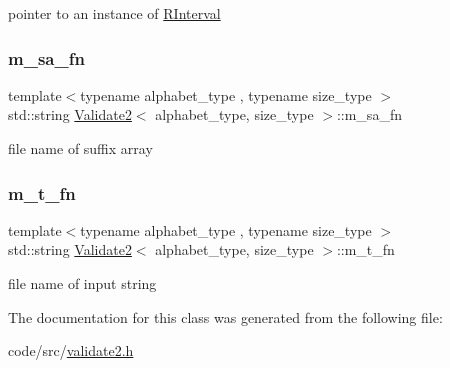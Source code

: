 pointer to an instance of \hyperlink{struct_validate2_1_1_r_interval}{R\+Interval} 

\mbox{\label{class_validate2_a50d06103a2020809e3e6848732870df1}} 
\subsubsection{\texorpdfstring{m\+\_\+sa\+\_\+fn}{m\_sa\_fn}}
{\footnotesize\ttfamily template$<$typename alphabet\+\_\+type , typename size\+\_\+type $>$ \\
std\+::string \hyperlink{class_validate2}{Validate2}$<$ alphabet\+\_\+type, size\+\_\+type $>$\+::m\+\_\+sa\+\_\+fn\hspace{0.3cm}{\ttfamily [private]}}



file name of suffix array 

\mbox{\label{class_validate2_aefa1d9c5ac628be8be94f03668782e07}} 
\subsubsection{\texorpdfstring{m\+\_\+t\+\_\+fn}{m\_t\_fn}}
{\footnotesize\ttfamily template$<$typename alphabet\+\_\+type , typename size\+\_\+type $>$ \\
std\+::string \hyperlink{class_validate2}{Validate2}$<$ alphabet\+\_\+type, size\+\_\+type $>$\+::m\+\_\+t\+\_\+fn\hspace{0.3cm}{\ttfamily [private]}}



file name of input string 



The documentation for this class was generated from the following file\+:\begin{DoxyCompactItemize}
\item 
code/src/\hyperlink{validate2_8h}{validate2.\+h}\end{DoxyCompactItemize}
